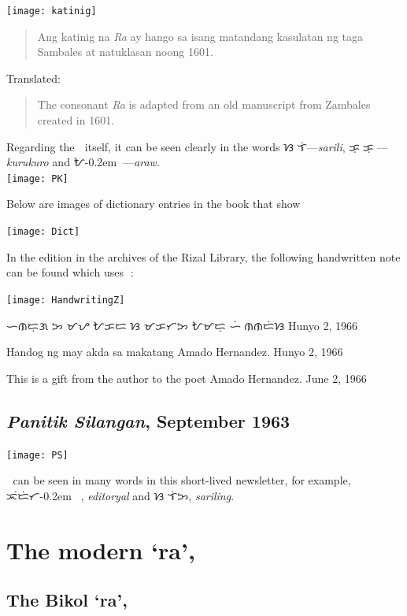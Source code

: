 \documentclass[a4paper,pagesize,openany,14pt,parskip=never]{scrbook}
\newcommand{\≈}{$\approx$}
\begin{document}
\texttt{[image: katinig]}

\begin{quote}
    Ang katinig na {\em Ra} ay hango sa isang matandang kasulatan ng taga Sambales at natuklasan noong 1601. 
\end{quote}

Translated:

\begin{quote}
    The consonant {\em Ra} is adapted from an old manuscript from Zambales created in 1601. 
\end{quote}
\newpage

Regarding the {\baybayinh ᜍ} itself, it can be seen clearly in the words {\baybayinh ᜐᜍᜒᜎᜒ}---{\em sarili}, {\baybayinh ᜃᜓᜍᜓᜃᜓᜍᜓ}---{\em kurukuro} and {\baybayinh ᜀ\kern-0.2emᜍᜏ}---{\em araw}.
 \\
\texttt{[image: PK]}

\newpage
Below are images of dictionary entries in the book that show {\baybayinh ᜍ}

\texttt{[image: Dict]}

In the edition in the archives of the Rizal Library, the following handwritten note can be found which uses {\baybayinh ᜍ}:

\texttt{[image: HandwritingZ]}

{\baybayinh ᜑᜈᜇᜓᜄ ᜅ ᜋᜌ ᜀᜃᜇ ᜐ ᜋᜃᜆᜅ ᜀᜋᜇᜓ ᜑᜒᜍᜈᜈᜇᜒᜐ} Hunyo 2, 1966

Handog ng may akda sa makatang Amado Hernandez. Hunyo 2, 1966

This is a gift from the author to the poet Amado Hernandez. June 2, 1966

\subsection{{\em Panitik Silangan}, September 1963}
\texttt{[image: PS]}

{\baybayinh ᜍ} can be seen in many words in this short-lived newsletter, for example, {\baybayinh ᜁᜒᜇᜒᜆ\kern-0.2emᜍᜌᜎ}, {\em editoryal} and {\baybayinh ᜐᜍᜒᜎᜒᜅ}, {\em sariling}.

\newpage
\section{The modern `ra', {\baybayin ᜍ}}
\subsection{The Bikol `ra', {\baybayinb {} } }
\label{BikolRa}
\end{document}
